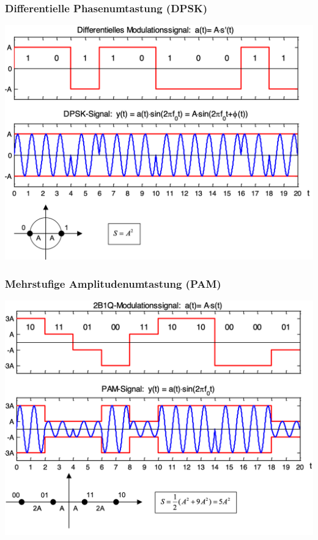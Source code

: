 \subsubsection{Differentielle Phasenumtastung (DPSK)}
\begin{center}
    \includegraphics[width=\linewidth]{graphic/fourier/Differentielle Phasenumtastung.png}
\end{center}
\vspace{-8pt}

\subsubsection{Mehrstufige Amplitudenumtastung (PAM)}
\begin{center}
    \includegraphics[width=\linewidth]{graphic/fourier/Mehrstufige Amplitudenumtastung.png}
\end{center}
\vspace{-8pt}

